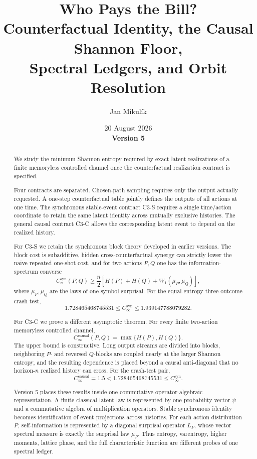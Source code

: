 \documentclass[11pt,a4paper]{article}
\title{
\textbf{Who Pays the Bill?}\\[1mm]
\large
Counterfactual Identity, the Causal Shannon Floor,\\
Spectral Ledgers, and Orbit Resolution
}
\author{Jan Mikulík}
\date{20 August 2026\\[1mm]\textbf{Version 5}}
\newcommand{\1}{\mathbf 1}
\begin{document}
\maketitle

\begin{abstract}

We study the minimum Shannon entropy required by exact latent
realizations of a finite memoryless controlled channel once the
counterfactual realization contract is specified.

Four contracts are separated.
Chosen-path sampling requires only the output actually requested.
A one-step counterfactual table jointly defines the outputs of all
actions at one time.
The synchronous stable-event contract C3-S requires a single
time/action coordinate to retain the same latent identity across
mutually exclusive histories.
The general causal contract C3-C allows the corresponding latent event
to depend on the realized history.

For C3-S we retain the synchronous block theory developed in earlier
versions.
The block cost is subadditive, hidden cross-counterfactual synergy can
strictly lower the naive repeated one-shot cost, and for two actions
\(P,Q\) one has the information-spectrum converse
\[
C_n^{\mathrm{syn}}(P,Q)
\ge
\frac n2
\left[
H(P)+H(Q)+W_1(\mu_P,\mu_Q)
\right],
\]
where \(\mu_P,\mu_Q\) are the laws of one-symbol surprisal.
For the equal-entropy three-outcome crash test,
\[
1.728465468745531
\le
C_\infty^{\mathrm{syn}}
\le
1.939147788079282.
\]

For C3-C we prove a different asymptotic theorem.
For every finite two-action memoryless controlled channel,
\[
\boxed{
C_\infty^{\mathrm{causal}}(P,Q)
=
\max\{H(P),H(Q)\}.
}
\]
The upper bound is constructive.
Long output streams are divided into blocks, neighboring \(P\)- and
reversed \(Q\)-blocks are coupled nearly at the larger Shannon entropy,
and the resulting dependence is placed beyond a causal anti-diagonal
that no horizon-\(n\) realized history can cross.
For the crash-test pair,
\[
\boxed{
C_\infty^{\mathrm{causal}}
=
1.5
<
1.728465468745531
\le
C_\infty^{\mathrm{syn}}.
}
\]

Version 5 places these results inside one commutative operator-algebraic
representation.
A finite classical latent law is represented by one probability vector
\(\psi\) and a commutative algebra of multiplication operators.
Stable synchronous identity becomes identification of event projections
across histories.
For each action distribution \(P\), self-information is represented by
a diagonal surprisal operator \(L_P\), whose vector spectral measure is
exactly the surprisal law \(\mu_P\).
Thus entropy, varentropy, higher moments, lattice phase, and the full
characteristic function are different probes of one spectral ledger.


\end{abstract}
\end{document}
